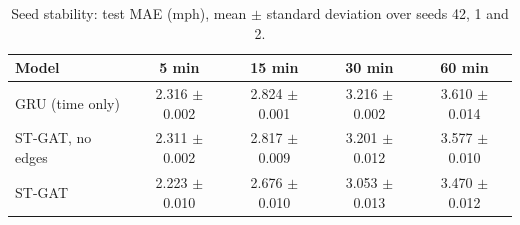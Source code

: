 \begin{table}[t]
\centering
\caption{Seed stability: test MAE (mph), mean $\pm$ standard deviation over seeds 42, 1 and 2.}
\label{tab:seeds}
\begin{tabular}{@{}lcccc@{}}
\toprule
Model & 5 min & 15 min & 30 min & 60 min \\
\midrule
GRU (time only) & 2.316 $\pm$ 0.002 & 2.824 $\pm$ 0.001 & 3.216 $\pm$ 0.002 & 3.610 $\pm$ 0.014 \\
ST-GAT, no edges & 2.311 $\pm$ 0.002 & 2.817 $\pm$ 0.009 & 3.201 $\pm$ 0.012 & 3.577 $\pm$ 0.010 \\
ST-GAT & 2.223 $\pm$ 0.010 & 2.676 $\pm$ 0.010 & 3.053 $\pm$ 0.013 & 3.470 $\pm$ 0.012 \\
\bottomrule
\end{tabular}
\end{table}
